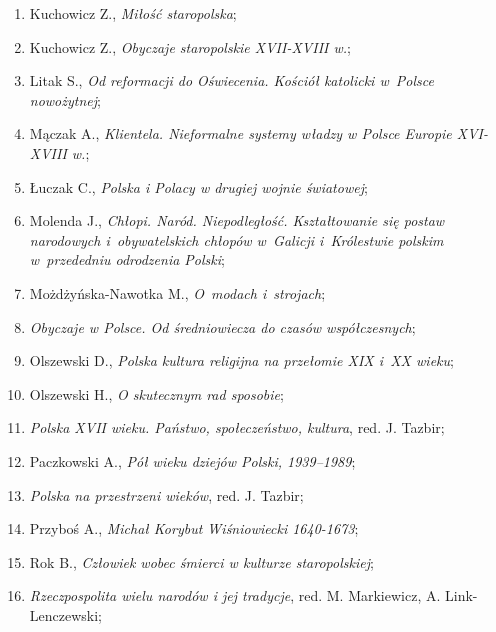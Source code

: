 \documentclass[a4paper,11pt]{article}
\begin{document}
\begin{enumerate}
\item Kuchowicz Z., \textit{Miłość staropolska};

\item Kuchowicz Z., \textit{Obyczaje staropolskie XVII-XVIII w.};

\item Litak S., \textit{Od reformacji do Oświecenia. Kościół katolicki
    w~Polsce nowożytnej};

\item Mączak A., \textit{Klientela. Nieformalne systemy władzy w Polsce
    Europie XVI-XVIII w.};

\item Łuczak C., \textit{Polska i Polacy w drugiej wojnie światowej};

\item Molenda J., \textit{Chłopi. Naród. Niepodległość. Kształtowanie
    się postaw narodowych i~obywatelskich chłopów w~Galicji
    i~Królestwie polskim w~przededniu odrodzenia Polski};

\item Możdżyńska-Nawotka M., \textit{O~modach i~strojach};

\item \textit{Obyczaje w Polsce. Od średniowiecza do czasów
    współczesnych};

\item Olszewski D., \textit{Polska kultura religijna na przełomie XIX
    i~XX wieku};

\item Olszewski H., \textit{O skutecznym rad sposobie};

\item \textit{Polska XVII wieku. Państwo, społeczeństwo, kultura}, red.
  J. Tazbir;

\item Paczkowski A., \textit{Pół wieku dziejów Polski, 1939--1989};

\item \textit{Polska na przestrzeni wieków}, red. J. Tazbir;

\item Przyboś A., \textit{Michał Korybut Wiśniowiecki 1640-1673};

\item Rok B., \textit{Człowiek wobec śmierci w kulturze staropolskiej};

\item \textit{Rzeczpospolita wielu narodów i jej tradycje}, red. M.
  Markiewicz, A. Link-Lenczewski;


\end{enumerate}
\end{document}

